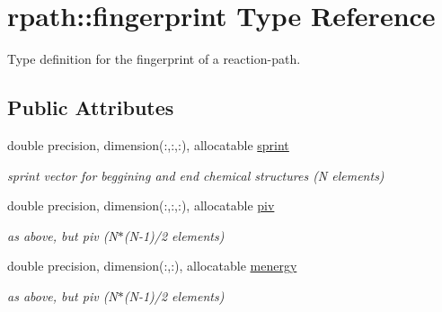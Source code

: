 \hypertarget{structrpath_1_1fingerprint}{}\section{rpath\+:\+:fingerprint Type Reference}
\label{structrpath_1_1fingerprint}


Type definition for the fingerprint of a reaction-\/path.  


\subsection*{Public Attributes}
\begin{DoxyCompactItemize}
\item 
\mbox{\label{structrpath_1_1fingerprint_acd8c9a88a3fdfab1d8487e614d486724}} 
double precision, dimension(\+:,\+:,\+:), allocatable \mbox{\hyperlink{structrpath_1_1fingerprint_acd8c9a88a3fdfab1d8487e614d486724}{sprint}}
\begin{DoxyCompactList}\small\item\em sprint vector for beggining and end chemical structures (N elements) \end{DoxyCompactList}\item 
\mbox{\label{structrpath_1_1fingerprint_a857712f7c0990423c520c4f928d158ee}} 
double precision, dimension(\+:,\+:,\+:), allocatable \mbox{\hyperlink{structrpath_1_1fingerprint_a857712f7c0990423c520c4f928d158ee}{piv}}
\begin{DoxyCompactList}\small\item\em as above, but piv (N$\ast$(N-\/1)/2 elements) \end{DoxyCompactList}\item 
\mbox{\label{structrpath_1_1fingerprint_ad8db5f549c785502178eb579fb8358ff}} 
double precision, dimension(\+:,\+:), allocatable \mbox{\hyperlink{structrpath_1_1fingerprint_ad8db5f549c785502178eb579fb8358ff}{menergy}}
\begin{DoxyCompactList}\small\item\em as above, but piv (N$\ast$(N-\/1)/2 elements) \end{DoxyCompactList}\item 
\mbox{\label{structrpath_1_1fingerprint_a57a154087205a98dcddecdb5982bf0ad}} 

\end{DoxyCompactItemize}
